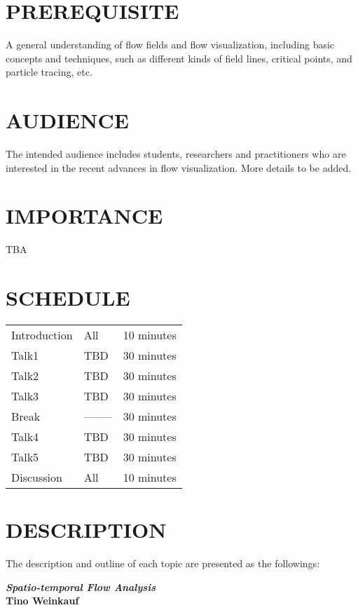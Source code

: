 \documentclass[preprint,journal]{vgtc}       %
\newcommand{\addverticalspace}{\vspace{3mm}}
\begin{document}
\section*{PREREQUISITE}
A general understanding of flow fields and flow visualization, including basic concepts and techniques, such as different kinds of field lines, critical points, and particle tracing, etc.

\section*{AUDIENCE}
The intended audience includes students, researchers and practitioners who are interested in the recent advances in flow visualization. More details to be added.


\section*{IMPORTANCE}
TBA

\section*{SCHEDULE}

\vspace{-0.1in}
\begin{table}[H]
\begin{tabular}{lll}
Introduction & All & 10 minutes\\
Talk1 & TBD & 30 minutes\\
Talk2 & TBD & 30 minutes\\
Talk3 & TBD & 30 minutes\\
Break & -------- & 30 minutes\\
Talk4 & TBD & 30 minutes\\
Talk5 & TBD & 30 minutes\\
Discussion & All & 10 minutes
\end{tabular}
\end{table}

\section*{DESCRIPTION}
The description and outline of each topic are presented as the followings:

\addverticalspace

\noindent\textbf{\textit{Spatio-temporal Flow Analysis}}\\
\textbf{Tino Weinkauf}
\end{document}
